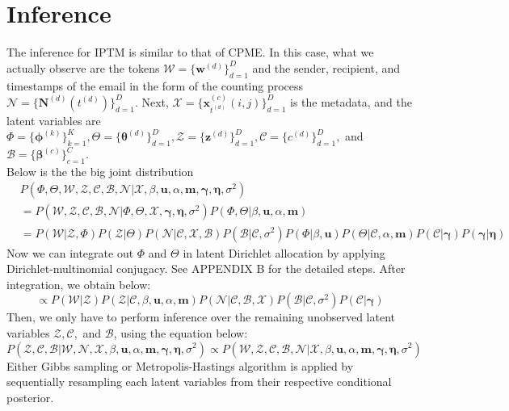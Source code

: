 \documentclass[a4paper]{article}
\begin{document}
 \section{Inference}
 The inference for IPTM is similar to that of CPME. In this case, what we actually observe are the tokens $\mathcal{W}=\{\boldsymbol{w}^{(d)} \}_{d=1}^{D}$ and the sender, recipient, and timestamps of the email in the form of the counting process $\mathcal{N}=\{\boldsymbol{N}^{(d)}(t^{(d)}) \}_{d=1}^{D}.$ Next,  $\mathcal{X}=\{\boldsymbol{x}^{(c)}_{t^{(d)}}(i, j)\}_{d=1}^{D}$ is the metadata, and the latent variables are $\Phi=\{\boldsymbol{\phi}^{(k)}\}_{k=1}^{K}, \Theta=\{\boldsymbol{\theta}^{(d)} \}_{d=1}^{D}, \mathcal{Z}=\{\boldsymbol{z}^{(d)} \}_{d=1}^{D}, \mathcal{C}=\{{c}^{(d)} \}_{d=1}^{D},$ and $\mathcal{B}=\{\boldsymbol{\beta}^{(c)} \}_{c=1}^{C}$.\\
 \newline 
 Below is the the big joint distribution
 \begin{equation}
 \begin{aligned}
 & P(\Phi, \Theta, \mathcal{W}, \mathcal{Z}, \mathcal{C}, \mathcal{B}, \mathcal{N}| \mathcal{X}, \beta, \boldsymbol{u}, \alpha, \boldsymbol{m}, \boldsymbol{\gamma}, \boldsymbol{\eta}, \sigma^2) \\& 
 =  P(\mathcal{W}, \mathcal{Z}, \mathcal{C}, \mathcal{B}, \mathcal{N}| \Phi, \Theta, \mathcal{X}, \boldsymbol{\gamma}, \boldsymbol{\eta}, \sigma^2) P(\Phi, \Theta |\beta, \boldsymbol{u}, \alpha, \boldsymbol{m})
 \\&= P( \mathcal{W}| \mathcal{Z}, \Phi)P(\mathcal{Z}|\Theta)P(\mathcal{N}|\mathcal{C}, \mathcal{X}, \mathcal{B})P(\mathcal{B}|\mathcal{C}, \sigma^2)P(\Phi|\beta, \boldsymbol{u})P(\Theta|\mathcal{C}, \alpha, \boldsymbol{m})P(\mathcal{C}|\boldsymbol{\gamma})P(\boldsymbol{\gamma}|\boldsymbol{\eta})
 \end{aligned}
 \end{equation}
 Now we can integrate out $\Phi$ and $\Theta$ in latent Dirichlet allocation by applying Dirichlet-multinomial conjugacy. See APPENDIX B for the detailed steps. After integration, we obtain below:
 \begin{equation}
 \propto P(\mathcal{W}|\mathcal{Z})P( \mathcal{Z}|\mathcal{C}, \beta, \boldsymbol{u}, \alpha, \boldsymbol{m})P(\mathcal{N}|\mathcal{C}, \mathcal{B}, \mathcal{X})P(\mathcal{B}|\mathcal{C}, \sigma^2)P(\mathcal{C}|\boldsymbol{\gamma})
 \end{equation}
 Then, we only have to perform inference over the remaining unobserved latent variables $\mathcal{Z}, \mathcal{C},$ and $\mathcal{B}$, using the equation below:
 \begin{equation}
 P( \mathcal{Z}, \mathcal{C}, \mathcal{B}|\mathcal{W}, \mathcal{N}, \mathcal{X}, \beta, \boldsymbol{u}, \alpha, \boldsymbol{m}, \boldsymbol{\gamma}, \boldsymbol{\eta}, \sigma^2) \propto P(\mathcal{W},  \mathcal{Z}, \mathcal{C}, \mathcal{B}, \mathcal{N} | \mathcal{X}, \beta, \boldsymbol{u}, \alpha, \boldsymbol{m}, \boldsymbol{\gamma}, \boldsymbol{\eta}, \sigma^2)
 \end{equation}
 Either Gibbs sampling or Metropolis-Hastings algorithm is applied by sequentially resampling each latent variables from their respective conditional posterior.
\end{document}
